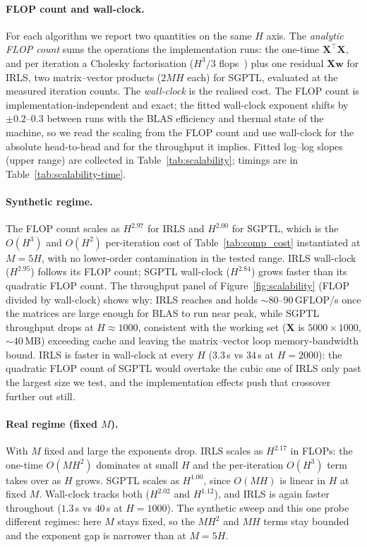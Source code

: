 \paragraph{FLOP count and wall-clock.}
For each algorithm we report two quantities on the same $H$ axis. The
\emph{analytic FLOP count} sums the operations the implementation runs: the
one-time $\mathbf X^\top\mathbf X$, and per iteration a Cholesky factorisation
($H^{3}/3$ flops~\cite[Lecture 23]{trefethen1997numerical}) plus one residual
$\mathbf X\mathbf w$ for IRLS, two matrix--vector products ($2MH$ each) for
SGPTL, evaluated at the measured iteration counts. The \emph{wall-clock} is the
realised cost. The FLOP count is implementation-independent and exact; the
fitted wall-clock exponent shifts by $\pm 0.2$--$0.3$ between runs with the BLAS
efficiency and thermal state of the machine, so we read the scaling from the
FLOP count and use wall-clock for the absolute head-to-head and for the
throughput it implies. Fitted log--log slopes (upper range) are collected in
Table~\ref{tab:scalability}; timings are in Table~\ref{tab:scalability-time}.

\paragraph{Synthetic regime.}
The FLOP count scales as $H^{2.97}$ for IRLS and $H^{2.00}$ for SGPTL, which is
the $O(H^{3})$ and $O(H^{2})$ per-iteration cost of Table~\ref{tab:comp_cost}
instantiated at $M=5H$, with no lower-order contamination in the tested range.
IRLS wall-clock ($H^{2.95}$) follows its FLOP count; SGPTL wall-clock
($H^{2.84}$) grows faster than its quadratic FLOP count. The throughput panel
of Figure~\ref{fig:scalability} (FLOP divided by wall-clock) shows why:
IRLS reaches and holds $\sim\!80$--$90$\,GFLOP/s once the matrices are large
enough for BLAS to run near peak, while SGPTL throughput drops at $H\approx1000$,
consistent with the working set ($\mathbf X$ is $5000\times1000$, $\sim\!40$\,MB)
exceeding cache and leaving the matrix--vector loop memory-bandwidth bound. IRLS is faster in
wall-clock at every $H$ ($3.3$\,s vs $34$\,s at $H=2000$): the quadratic FLOP
count of SGPTL would overtake the cubic one of IRLS only past the largest size
we test, and the implementation effects push that crossover further out still.

\paragraph{Real regime (fixed $M$).}
With $M$ fixed and large the exponents drop. IRLS scales as $H^{2.17}$ in FLOPs:
the one-time $O(MH^{2})$ dominates at small $H$ and the per-iteration $O(H^{3})$
term takes over as $H$ grows. SGPTL scales as $H^{1.00}$, since $O(MH)$ is linear
in $H$ at fixed $M$. Wall-clock tracks both ($H^{2.02}$ and $H^{1.12}$), and IRLS
is again faster throughout ($1.3$\,s vs $40$\,s at $H=1000$). The synthetic
sweep and this one probe different regimes: here $M$ stays fixed, so the
$MH^{2}$ and $MH$ terms stay bounded and the exponent gap is narrower than at
$M=5H$.

